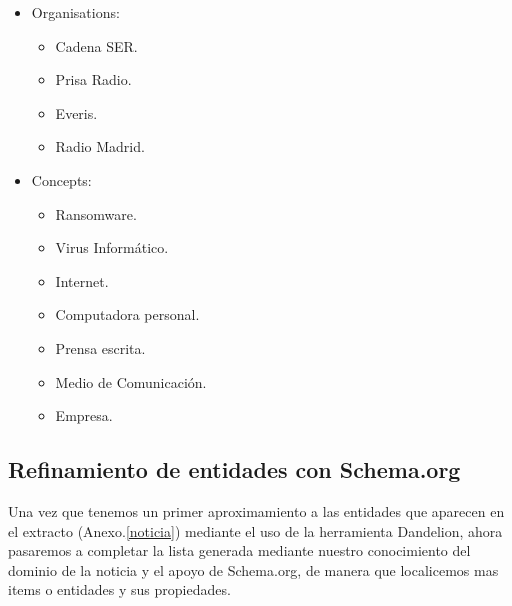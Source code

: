 \documentclass{llncs}   %
\begin{document}
\begin{itemize}
    \item Organisations:
    \begin{itemize}
        \item Cadena SER.
        \item Prisa Radio.
        \item Everis.
        \item Radio Madrid.
    \end{itemize}
    \item Concepts:
    \begin{itemize}
        \item Ransomware.
        \item Virus Informático.
        \item Internet.
        \item Computadora personal.
        \item Prensa escrita.
        \item Medio de Comunicación.
        \item Empresa.
    \end{itemize}
\end{itemize}

\subsection{Refinamiento de entidades con Schema.org}

Una vez que tenemos un primer aproximamiento a las entidades que aparecen en el extracto 
(Anexo.\ref{noticia}) mediante el uso de la herramienta Dandelion, ahora pasaremos a completar 
la lista generada mediante nuestro conocimiento del dominio de la noticia y el apoyo de Schema.org, 
de manera que localicemos mas items o entidades y sus propiedades.
\end{document}
